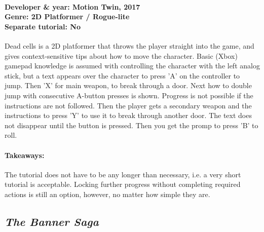 \paragraph{Developer \& year: Motion Twin, 2017 \\ Genre: 2D Platformer / Rogue-lite \\ Separate tutorial: No \\}
Dead cells is a 2D platformer that throws the player straight into the game, and gives context-sensitive tips about how to move the character. Basic (Xbox) gamepad knowledge is assumed with controlling the character with the left analog stick, but a text appears over the character to press 'A' on the controller to jump. Then 'X' for main weapon, to break through a door. Next how to double jump with consecutive A-button presses is shown. Progress is not possible if the instructions are not followed. Then the player gets a secondary weapon and the instructions to press 'Y' to use it to break through another door. The text does not disappear until the button is pressed. Then you get the promp to press 'B' to roll.
\paragraph{Takeaways:}
The tutorial does not have to be any longer than necessary, i.e. a very short tutorial is acceptable. Locking further progress without completing required actions is still an option, however, no matter how simple they are.

\subsection{\textit{The Banner Saga}}

